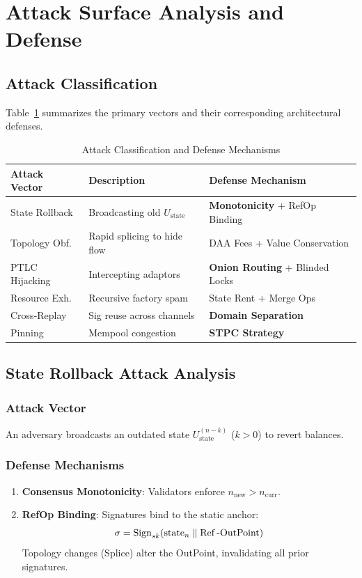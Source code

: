 \section{Attack Surface Analysis and Defense}

\subsection{Attack Classification}

Table~\ref{tab:attack_matrix} summarizes the primary vectors and their corresponding architectural defenses.

\begin{table}[htbp]
\centering
\caption{Attack Classification and Defense Mechanisms}
\label{tab:attack_matrix}
\small
\begin{tabularx}{\linewidth}{@{}l X X@{}}
\toprule
\textbf{Attack Vector} & \textbf{Description} & \textbf{Defense Mechanism} \\
\midrule
State Rollback & Broadcasting old $U_{\mathrm{state}}$ & \textbf{Monotonicity} + RefOp Binding \\
Topology Obf. & Rapid splicing to hide flow & DAA Fees + Value Conservation \\
PTLC Hijacking & Intercepting adaptors & \textbf{Onion Routing} + Blinded Locks \\
Resource Exh. & Recursive factory spam & State Rent + Merge Ops \\
Cross-Replay & Sig reuse across channels & \textbf{Domain Separation} \\
Pinning & Mempool congestion & \textbf{STPC Strategy} \\
\bottomrule
\end{tabularx}
\end{table}

\subsection{State Rollback Attack Analysis}

\subsubsection{Attack Vector}
An adversary broadcasts an outdated state $U_{\mathrm{state}}^{(n-k)}$ ($k > 0$) to revert balances.

\subsubsection{Defense Mechanisms}
\begin{enumerate}
    \item \textbf{Consensus Monotonicity}: Validators enforce $n_{\mathrm{new}} > n_{\mathrm{curr}}$.
    \item \textbf{RefOp Binding}: Signatures bind to the static anchor:
    $$ \sigma = \mathrm{Sign}_{sk}(\mathrm{state}_n \parallel \operatorname{Ref}\text{-OutPoint}) $$
    Topology changes (Splice) alter the OutPoint, invalidating all prior signatures.
\end{enumerate}

